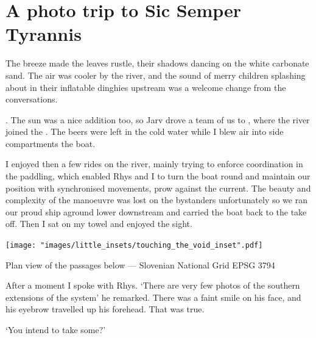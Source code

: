 \section{A photo trip to Sic Semper Tyrannis}
                    
    The breeze made the leaves rustle, their shadows dancing on the white carbonate sand. The air was cooler by the  river, and the sound of merry children splashing about in their inflatable dinghies upstream was a welcome change from the  conversations.
    
    . The sun was a nice addition too, so Jarv drove a team of us to , where the  river joined the . The beers were left in the cold water while I blew air into side compartments the boat.
    
    I enjoyed then a few rides on the river, mainly trying to enforce coordination in the paddling, which enabled Rhys and I to turn the boat round and maintain our position with synchronised movements, prow against the current. The beauty and complexity of the manoeuvre was lost on the bystanders unfortunately so we ran our proud ship aground lower downstream and carried the boat back to the take off. Then I sat on my towel and enjoyed the sight.


\begin{marginsurvey}
	\texttt{[image: "images/little\_insets/touching\_the\_void\_inset".pdf]}
	\caption[Davy Jones' Locker]{Plan view of the passages below \protect{} --- Slovenian National Grid EPSG 3794}
\end{marginsurvey}


    After a moment I spoke with Rhys.
    `There are very few photos of the southern extensions of the system' he remarked. There was a faint smile on his face, and his eyebrow travelled up his forehead.  That was true. 

`You intend to take some?'

